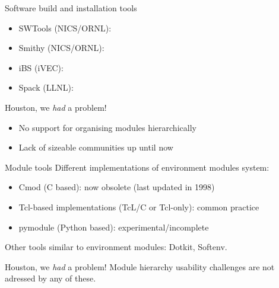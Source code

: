 \documentclass[10pt,xcolor={usenames,dvipsnames}]{beamer}
\begin{document}
\begin{frame}{Software build and installation tools}
\begin{itemize}
    \item SWTools (NICS/ORNL):
    \item Smithy (NICS/ORNL):
    \item iBS (iVEC):
    \item Spack (LLNL): 
\end{itemize}

\begin{center}
    \begin{minipage}{0.9\textwidth}
        \begin{alertblock}{Houston, we \emph{had} a problem!}
            \footnotesize
            \begin{itemize}
            \item No support for organising modules hierarchically
            \item Lack of sizeable communities up until now
            \end{itemize}
        \end{alertblock}
    \end{minipage}
\end{center}

\end{frame}


\begin{frame}{Module tools}
Different implementations of environment modules system:
\begin{itemize}
    \item Cmod (C based): now obsolete (last updated in 1998)
    \item Tcl-based implementations (TcL/C or Tcl-only): common practice
    \item pymodule (Python based): experimental/incomplete
\end{itemize}
Other tools similar to environment modules: Dotkit, Softenv.

\begin{center}
    \begin{minipage}{0.9\textwidth}
        \begin{alertblock}{Houston, we \emph{had} a problem!}
            \footnotesize
            Module hierarchy usability challenges are not adressed by any of these.
        \end{alertblock}
    \end{minipage}
\end{center}
\end{frame}
\end{document}
